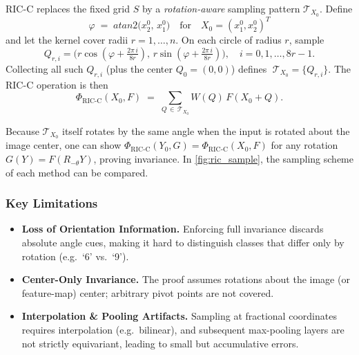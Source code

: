 RIC-C replaces the fixed grid \(S\) by a \emph{rotation-aware} sampling pattern \(\mathcal T_{X_0}\).  Define
\[
\varphi \;=\;atan2\bigl(x^0_2,\,x^0_1\bigr)
\quad\text{for}\quad
X_0=(x^0_1,x^0_2)^T
\]
and let the kernel cover radii \(r=1,\dots,n\).  On each circle of radius \(r\), sample
\begin{equation}
Q_{r,i}
=
\bigl(r\cos(\varphi + \tfrac{2\pi\,i}{8r}),\,r\sin(\varphi + \tfrac{2\pi\,i}{8r})\bigr),
\quad
i=0,1,\dots,8r-1.
\label{eq:ric_points}
\end{equation}
Collecting all such \(Q_{r,i}\) (plus the center \(Q_{0}=(0,0)\)) defines
\(\;\mathcal T_{X_0}=\{Q_{r,i}\}\).
The RIC-C operation is then
\begin{equation}
\Phi_{\mathrm{RIC\text{-}C}}(X_0, F)
\;=\;
\sum_{Q \,\in\, \mathcal T_{X_0}} W(Q)\,F(X_0 + Q).
\label{eq:ric_conv}
\end{equation}

\noindent
Because \(\mathcal T_{X_0}\) itself rotates by the same angle when the input is rotated about the image center, one can show
\(\Phi_{\mathrm{RIC\text{-}C}}(Y_0,G) = \Phi_{\mathrm{RIC\text{-}C}}(X_0,F)\)
for any rotation \(G(Y) = F(R_{-\theta} Y)\), proving invariance. In \ref{fig:ric_sample}, the sampling scheme of each method can be compared.

\subsubsection*{Key Limitations}

\begin{itemize}
  \item \textbf{Loss of Orientation Information.}  Enforcing full invariance discards absolute angle cues, making it hard to distinguish classes that differ only by rotation (e.g.\ ‘6’ vs.\ ‘9’).  
  \item \textbf{Center-Only Invariance.}  The proof assumes rotations about the image (or feature-map) center; arbitrary pivot points are not covered.  
  \item \textbf{Interpolation \& Pooling Artifacts.}  Sampling at fractional coordinates requires interpolation (e.g.\ bilinear), and subsequent max-pooling layers are not strictly equivariant, leading to small but accumulative errors.
\end{itemize}